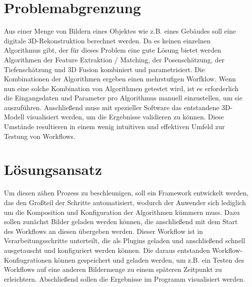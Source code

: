 \section{Problemabgrenzung}
Aus einer Menge von Bildern eines Objektes wie z.B. eines Gebäudes soll eine digitale 3D-Rekonstruktion berechnet werden.\newline
Da es keinen einzelnen Algorithmus gibt, der für dieses Problem eine gute Lösung bietet werden Algorithmen der Feature Extraktion / Matching, der Posenschätzung, der Tiefenschätzung und 3D Fusion kombiniert und parametrisiert. Die Kombinationen der Algorithmen ergeben einen mehrstufigen Worfklow. Wenn nun eine solche Kombination von Algorithmen getestet wird, ist es erforderlich die Eingangsdaten und Parameter pro Algorithmus manuell einzustellen, um sie auszuführen. Anschließend muss mit spezieller Software das entstandene 3D-Modell visualisiert werden, um die Ergebnisse validieren zu können.\newline
Diese Umstände resultieren in einem wenig intuitiven und effektiven Umfeld zur Testung von Workflows.

\section{Lösungsansatz}
Um diesen zähen Prozess zu beschleunigen, soll ein Framework entwickelt werden, das den Großteil der Schritte automatisiert, wodurch der Anwender sich lediglich um die Komposition und Konfiguration der Algorithmen kümmern muss. Dazu sollen zunächst Bilder geladen werden können, die anschließend mit dem Start des Workflows an diesen übergeben werden. Dieser Workflow ist in Verarbeitungsschritte unterteilt, die als Plugins geladen und anschließend schnell ausgetauscht und konfiguriert werden können. Die daraus entstanden Workflow-Konfiugrationen können gespeichert und geladen werden, um z.B. ein Testen des Workflows auf eine anderen Bildermenge zu einem späteren Zeitpunkt zu erleichtern. Abschließend sollen die Ergebnisse im Programm visualisiert werden.